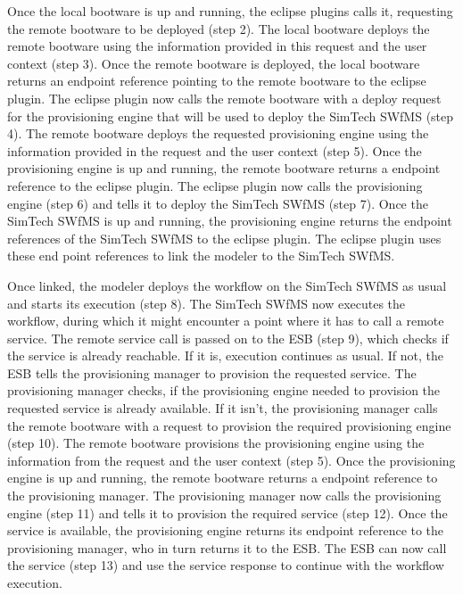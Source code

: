 Once the local bootware is up and running, the eclipse plugins calls it, requesting the remote bootware to be deployed (step 2).
The local bootware deploys the remote bootware using the information provided in this request and the user context (step 3).
Once the remote bootware is deployed, the local bootware returns an endpoint reference pointing to the remote bootware to the eclipse plugin.
The eclipse plugin now calls the remote bootware with a deploy request for the provisioning engine that will be used to deploy the SimTech SWfMS (step 4).
The remote bootware deploys the requested provisioning engine using the information provided in the request and the user context (step 5).
Once the provisioning engine is up and running, the remote bootware returns a endpoint reference to the eclipse plugin.
The eclipse plugin now calls the provisioning engine (step 6) and tells it to deploy the SimTech SWfMS (step 7).
Once the SimTech SWfMS is up and running, the provisioning engine returns the endpoint references of the SimTech SWfMS to the eclipse plugin.
The eclipse plugin uses these end point references to link the modeler to the SimTech SWfMS.

Once linked, the modeler deploys the workflow on the SimTech SWfMS as usual and starts its execution (step 8).
The SimTech SWfMS now executes the workflow, during which it might encounter a point where it has to call a remote service.
The remote service call is passed on to the ESB (step 9), which checks if the service is already reachable.
If it is, execution continues as usual.
If not, the ESB tells the provisioning manager to provision the requested service.
The provisioning manager checks, if the provisioning engine needed to provision the requested service is already available.
If it isn't, the provisioning manager calls the remote bootware with a request to provision the required provisioning engine (step 10).
The remote bootware provisions the provisioning engine using the information from the request and the user context (step 5).
Once the provisioning engine is up and running, the remote bootware returns a endpoint reference to the provisioning manager.
The provisioning manager now calls the provisioning engine (step 11) and tells it to provision the required service (step 12).
Once the service is available, the provisioning engine returns its endpoint reference to the provisioning manager, who in turn returns it to the ESB.
The ESB can now call the service (step 13) and use the service response to continue with the workflow execution.

